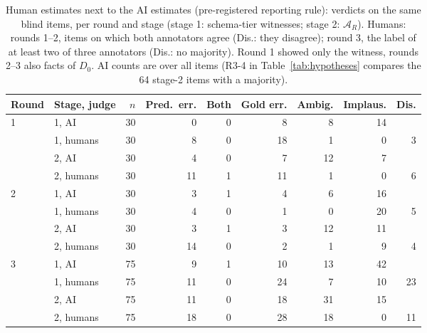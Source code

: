 \begin{table}[!htbp]
\centering\scriptsize
\caption{Human estimates next to the AI estimates (pre-registered reporting rule): verdicts on the same blind items, per round and stage (stage 1: schema-tier witnesses; stage 2: $\mathcal A_R$). Humans: rounds 1--2, items on which both annotators agree (Dis.: they disagree); round 3, the label of at least two of three annotators (Dis.: no majority). Round 1 showed only the witness, rounds 2--3 also facts of $D_0$. AI counts are over all items (R3-4 in Table~\ref{tab:hypotheses} compares the 64 stage-2 items with a majority).}\label{tab:humanai}
\setlength{\tabcolsep}{3pt}
\begin{tabular}{@{}llrrrrrrr@{}}
\toprule
Round & Stage, judge & $n$ & Pred.\ err. & Both & Gold err. & Ambig. & Implaus. & Dis.\\
\midrule
1 & 1, AI & 30 & 0 & 0 & 8 & 8 & 14 & \\
 & 1, humans & 30 & 8 & 0 & 18 & 1 & 0 & 3\\
\addlinespace[1pt]
 & 2, AI & 30 & 4 & 0 & 7 & 12 & 7 & \\
 & 2, humans & 30 & 11 & 1 & 11 & 1 & 0 & 6\\
\midrule
2 & 1, AI & 30 & 3 & 1 & 4 & 6 & 16 & \\
 & 1, humans & 30 & 4 & 0 & 1 & 0 & 20 & 5\\
\addlinespace[1pt]
 & 2, AI & 30 & 3 & 1 & 3 & 12 & 11 & \\
 & 2, humans & 30 & 14 & 0 & 2 & 1 & 9 & 4\\
\midrule
3 & 1, AI & 75 & 9 & 1 & 10 & 13 & 42 & \\
 & 1, humans & 75 & 11 & 0 & 24 & 7 & 10 & 23\\
\addlinespace[1pt]
 & 2, AI & 75 & 11 & 0 & 18 & 31 & 15 & \\
 & 2, humans & 75 & 18 & 0 & 28 & 18 & 0 & 11\\
\bottomrule
\end{tabular}
\end{table}
